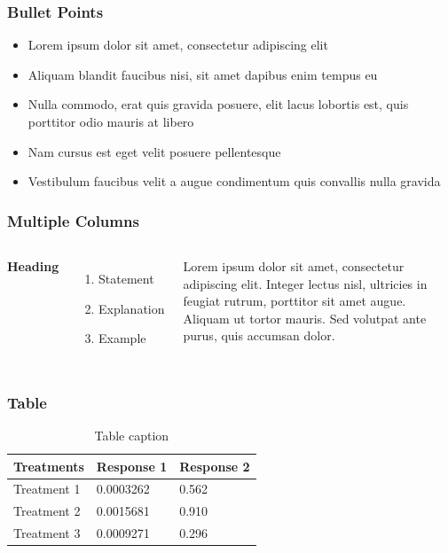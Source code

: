 \documentclass{beamer}
\begin{document}
\begin{frame}
  \frametitle{Bullet Points}
  \begin{itemize}
  \item Lorem ipsum dolor sit amet, consectetur adipiscing elit
  \item Aliquam blandit faucibus nisi, sit amet dapibus enim tempus eu
  \item Nulla commodo, erat quis gravida posuere, elit lacus lobortis
    est, quis porttitor odio mauris at libero
  \item Nam cursus est eget velit posuere pellentesque
  \item Vestibulum faucibus velit a augue condimentum quis convallis
    nulla gravida
  \end{itemize}
\end{frame}


\begin{frame}
  \frametitle{Multiple Columns}

  \begin{columns}[c] %

    \textbf{Heading}
    \begin{enumerate}
    \item Statement
    \item Explanation
    \item Example
    \end{enumerate}

    Lorem ipsum dolor sit amet, consectetur adipiscing elit. Integer
    lectus nisl, ultricies in feugiat rutrum, porttitor sit amet
    augue. Aliquam ut tortor mauris. Sed volutpat ante purus, quis
    accumsan dolor.

  \end{columns}
\end{frame}


\begin{frame}
\frametitle{Table}
\begin{table}
\begin{tabular}{l l l}
\toprule
\textbf{Treatments} & \textbf{Response 1} & \textbf{Response 2}\\
\midrule
Treatment 1 & 0.0003262 & 0.562 \\
Treatment 2 & 0.0015681 & 0.910 \\
Treatment 3 & 0.0009271 & 0.296 \\
\bottomrule
\end{tabular}
\caption{Table caption}
\end{table}
\end{frame}
\end{document}
